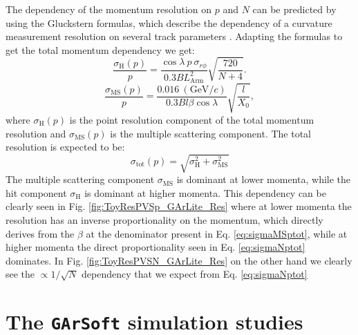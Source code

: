 The dependency of the momentum resolution on $p$ and $N$ can be predicted by using the Gluckstern formulas, which describe the dependency of a curvature measurement resolution on several track parameters \cite{PDG:34}. Adapting the formulas to get the total momentum dependency we get:
\begin{equation}\label{eq:sigmaNptot}
\frac{\sigma_{\text{H}}(p)}{p}=\frac{\cos\lambda \ p  \ \sigma_{r\phi}}{0.3 BL_\textrm{Arm}^2}\sqrt{\frac{720}{N+4}}.
\end{equation}
\begin{equation}\label{eq:sigmaMSptot}
\frac{\sigma_{\text{MS}}(p)}{p}=\frac{0.016 \ (\textrm{GeV}/c)}{0.3 B l\beta \cos \lambda}\sqrt{\frac{l}{X_0}},
\end{equation}
where $\sigma_{\text{H}}(p)$ is the point resolution component of the total momentum resolution and $\sigma_{\text{MS}}(p)$ is the multiple scattering component. The total resolution is expected to be:
\begin{equation}
    \sigma_\text{tot}(p)=\sqrt{\sigma_\text{H}^2+\sigma_\text{MS}^2}
\end{equation}
The multiple scattering component $\sigma_\text{MS}$ is dominant at lower momenta, while the hit component $\sigma_\text{H}$ is dominant at higher momenta. This dependency can be clearly seen in Fig. \ref{fig:ToyResPVSp_GArLite_Res} where at lower momenta the resolution has an inverse proportionality on the momentum, which directly derives from the $\beta$ at the denominator present in Eq. \ref{eq:sigmaMSptot}, while at higher momenta the direct proportionality seen in Eq. \ref{eq:sigmaNptot} dominates. In Fig. \ref{fig:ToyResPVSN_GArLite_Res} on the other hand we clearly see the $\propto 1/\sqrt{N}$ dependency that we expect from Eq. \ref{eq:sigmaNptot}

\section{The \texttt{GArSoft} simulation studies}
\label{Sec:MC-Studies-Lite}

